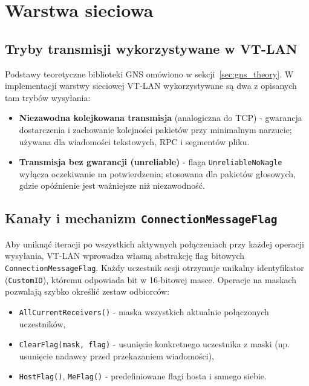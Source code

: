 \section{Warstwa sieciowa}
\label{sec:gns}

\subsection*{Tryby transmisji wykorzystywane w VT-LAN}

Podstawy teoretyczne biblioteki GNS \cite{GNS} omówiono
w sekcji~\ref{sec:gns_theory}. W implementacji warstwy sieciowej VT-LAN
wykorzystywane są dwa z opisanych tam trybów wysyłania:

\begin{itemize}
    \item \textbf{Niezawodna kolejkowana transmisja} (analogiczna do TCP) -
    gwarancja dostarczenia i zachowanie kolejności pakietów przy minimalnym
    narzucie; używana dla wiadomości tekstowych, RPC i segmentów pliku.
    \item \textbf{Transmisja bez gwarancji (unreliable)} - flaga
    \texttt{UnreliableNoNagle} wyłącza oczekiwanie na potwierdzenia;
    stosowana dla pakietów głosowych, gdzie opóźnienie jest ważniejsze
    niż niezawodność.
\end{itemize}

\subsection*{Kanały i mechanizm \texttt{ConnectionMessageFlag}}

Aby uniknąć iteracji po wszystkich aktywnych połączeniach przy każdej
operacji wysyłania, VT-LAN wprowadza własną abstrakcję flag bitowych
\texttt{ConnectionMessageFlag}. Każdy uczestnik sesji otrzymuje unikalny
identyfikator (\texttt{CustomID}), któremu odpowiada bit w 16-bitowej
masce. Operacje na maskach pozwalają szybko określić zestaw odbiorców:

\begin{itemize}
    \item \texttt{AllCurrentReceivers()} - maska wszystkich aktualnie
    połączonych uczestników,
    \item \texttt{ClearFlag(mask, flag)} - usunięcie konkretnego
    uczestnika z maski (np. usunięcie nadawcy przed przekazaniem wiadomości),
    \item \texttt{HostFlag()}, \texttt{MeFlag()} - predefiniowane flagi
    hosta i samego siebie.
\end{itemize}

